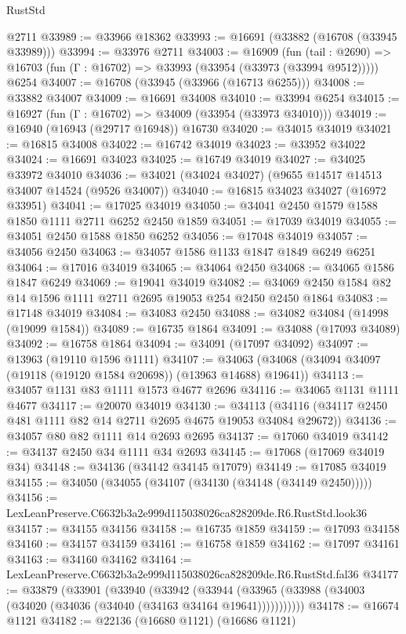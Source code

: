 \begin{lexlean}{RustStd}
\begin{coremodule}
    @2711
@33989 := @33966 @18362
@33993 := @16691 (@33882 (@16708 (@33945 @33989)))
@33994 := @33976 @2711
@34003 := @16909
    (fun (tail : @2690) => @16703 (fun (Γ : @16702) => @33993 (@33954 (@33973 (@33994 @9512)))))
    @6254
@34007 := @16708 (@33945 (@33966 (@16713 @6255)))
@34008 := @33882 @34007
@34009 := @16691 @34008
@34010 := @33994 @6254
@34015 := @16927 (fun (Γ : @16702) => @34009 (@33954 (@33973 @34010)))
@34019 := @16940 (@16943 (@29717 @16948)) @16730
@34020 := @34015 @34019
@34021 := @16815 @34008
@34022 := @16742 @34019
@34023 := @33952 @34022
@34024 := @16691 @34023
@34025 := @16749 @34019
@34027 := @34025 @33972 @34010
@34036 := @34021 (@34024 @34027) (@9655 @14517 @14513 @34007 @14524 (@9526 @34007))
@34040 := @16815 @34023 @34027 (@16972 @33951)
@34041 := @17025 @34019
@34050 := @34041 @2450 @1579 @1588 @1850 @1111 @2711 @6252 @2450 @1859
@34051 := @17039 @34019
@34055 := @34051 @2450 @1588 @1850 @6252
@34056 := @17048 @34019
@34057 := @34056 @2450
@34063 := @34057 @1586 @1133 @1847 @1849 @6249 @6251
@34064 := @17016 @34019
@34065 := @34064 @2450
@34068 := @34065 @1586 @1847 @6249
@34069 := @19041 @34019
@34082 := @34069 @2450 @1584 @82 @14 @1596 @1111 @2711 @2695 @19053 @254 @2450 @2450 @1864
@34083 := @17148 @34019
@34084 := @34083 @2450
@34088 := @34082 @34084 (@14998 (@19099 @1584))
@34089 := @16735 @1864
@34091 := @34088 (@17093 @34089)
@34092 := @16758 @1864
@34094 := @34091 (@17097 @34092)
@34097 := @13963 (@19110 @1596 @1111)
@34107 := @34063 (@34068 (@34094 @34097 (@19118 (@19120 @1584 @20698)) (@13963 @14688) @19641))
@34113 := @34057 @1131 @83 @1111 @1573 @4677 @2696
@34116 := @34065 @1131 @1111 @4677
@34117 := @20070 @34019
@34130 := @34113 (@34116 (@34117 @2450 @481 @1111 @82 @14 @2711 @2695 @4675 @19053 @34084 @29672))
@34136 := @34057 @80 @82 @1111 @14 @2693 @2695
@34137 := @17060 @34019
@34142 := @34137 @2450 @34 @1111 @34 @2693
@34145 := @17068 (@17069 @34019 @34)
@34148 := @34136 (@34142 @34145 @17079)
@34149 := @17085 @34019
@34155 := @34050 (@34055 (@34107 (@34130 (@34148 (@34149 @2450)))))
@34156 := LexLeanPreserve.C6632b3a2e999d115038026ca828209de.R6.RustStd.look36
@34157 := @34155 @34156
@34158 := @16735 @1859
@34159 := @17093 @34158
@34160 := @34157 @34159
@34161 := @16758 @1859
@34162 := @17097 @34161
@34163 := @34160 @34162
@34164 := LexLeanPreserve.C6632b3a2e999d115038026ca828209de.R6.RustStd.fal36
@34177 := @33879
    (@33901
      (@33940
        (@33942
          (@33944 (@33965 (@33988 (@34003 (@34020 (@34036 (@34040 (@34163 @34164 @19641)))))))))))
@34178 := @16674 @1121
@34182 := @22136 (@16680 @1121) (@16686 @1121)

\end{coremodule}
\end{lexlean}
